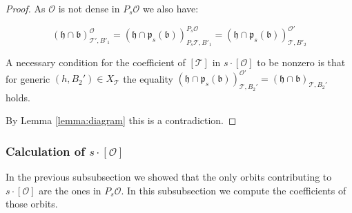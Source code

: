 \documentclass[12pt]{article}
\newcommand{\todo}[1]{{\color{red} TODO: #1}}
\newcommand{\s}{\mathcal{O}}
\theoremstyle{plain}
\theoremstyle{definition}
\begin{document}
\begin{proof}






    As $\s$ is not dense in $P_s\s$ we also have:

       $$ (\mathfrak{h} \cap \mathfrak{b})^{\mathcal{O}}_{\mathcal{T}',B'_{1}}=(\mathfrak{h} \cap \mathfrak{p}_{s}(\mathfrak{b}))^{P_{s}\mathcal{O}}_{ P_{s}\mathcal{T},B'_{1}}=(\mathfrak{h} \cap \mathfrak{p}_{s}(\mathfrak{b}))^{\mathcal{O}'}_{ \mathcal{T},B'_{2}}$$

    A necessary condition for the coefficient of $[\mathcal{T}]$ in $s\cdot [\s]$ to be nonzero is that for generic $(h,B_2')\in X_{\mathcal{T}}$ the equality
 $(\mathfrak{h}\cap \mathfrak{p}_{s}(\mathfrak{b}))^{\mathcal{O}'}_{\mathcal{T},B_{2}'}=(\mathfrak{h}\cap \mathfrak{b})_{\mathcal{T},B_{2}'}$ holds.

    
    
   By Lemma \ref{lemma:diagram} this is a contradiction.
    
\end{proof}

\subsubsection{Calculation of $s\cdot [\mathcal{O}]$}

In the previous subsubsection we showed that the only orbits contributing to $s\cdot [\mathcal{O}]$ are the ones in $P_s\s$. In this subsubsection we compute the coefficients of those orbits.
\end{document}
